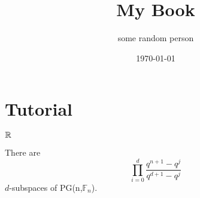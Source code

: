\documentclass{book}
\begin{document}
\title{My Book}
\author{some random person}
\date{\today}
\maketitle
\tableofcontents

\chapter{Tutorial}

$\R$





\begin{bob}%
    There are 
    \begin{displaymath}
        \prod_{i=0}^d \frac{q^{n+1}-q^j}{q^{d+1}-q^j}
    \end{displaymath}
    $d$-subspaces of PG(n,$\mathbb{F}_n$).
\end{bob}


\begin{tikzpicture}%
    
\end{tikzpicture}
\end{document}
